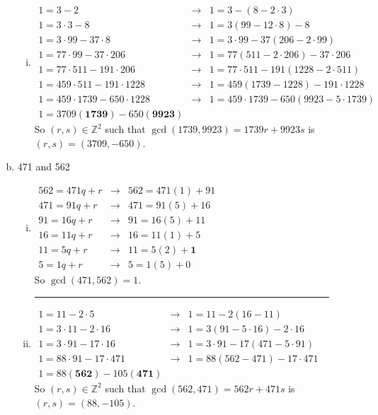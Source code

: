 \documentclass{article}
\begin{document}
\begin{description}
\begin{enumerate}[(a)]
\begin{enumerate}[(i)]
			
			\item$\begin{array}{ccc}
			1=3-2&  \to&  1=3-(8-2\cdot3)\\ 
			1=3\cdot3-8&  \to&  1=3(99-12\cdot8)-8\\ 
			1=3\cdot99-37\cdot8&  \to&  1=3\cdot99-37(206-2\cdot99)\\ 
			1=77\cdot99-37\cdot206&  \to&  1=77(511-2\cdot206)-37\cdot206\\ 
			1=77\cdot511-191\cdot206&\to  &  1=77\cdot511-191(1228-2\cdot511)\\ 
			1=459\cdot511-191\cdot1228&  \to&  1=459(1739-1228)-191\cdot1228\\ 
			1=459\cdot1739-650\cdot1228&  \to&  1=459\cdot1739-650(9923-5\cdot1739)\\ 
			1=3709\left(\mathbf{1739}\right)-650\left(\mathbf{9923}\right)&  & 
			\end{array} $ \\ So $(r,s)\in\mathbb{Z}^2$ such that $\gcd(1739,9923)=1739r+9923s$ is $(r,s)=(3709,-650)$.  
		\end{enumerate}
		\item 471 and 562
		\begin{enumerate}[(i)]
			\item
			$\begin{array}{ccc}
			562=471q+r&  \to&  562=471(1)+91\\ 
			471=91q+r&  \to&  471=91(5)+16\\ 
			91=16q+r&  \to&  91=16(5)+11\\ 
			16=11q+r&  \to&  16=11(1)+5\\ 
			11=5q+r&  \to&  11=5(2)+\mathbf{1}\\ 
			5=1q+r&  \to& 5=1(5)+0
			\end{array} $  \\ So $\gcd{(471,562)}=1$.\\ \noindent\rule{10cm}{0.4pt}
			
			
			\item$\begin{array}{ccc}
			1=11-2\cdot5& \to &  1=11-2(16-11)\\ 
			1=3\cdot11-2\cdot16&  \to&  1=3(91-5\cdot16)-2\cdot16\\ 
			1=3\cdot91-17\cdot16&  \to&  1=3\cdot91-17(471-5\cdot91)\\ 
			1=88\cdot91-17\cdot471&  \to&  1=88(562-471)-17\cdot471\\ 
			1=88(\mathbf{562})-105\left(\mathbf{471}\right)&  & 
			\end{array} $ \\ So $(r,s)\in\mathbb{Z}^2$ such that $\gcd(562,471)=562r+471s$ is $(r,s)=(88,-105)$.  
		\end{enumerate}
		

\end{enumerate}
\end{description}
\end{document}
